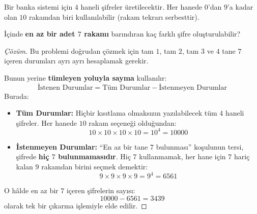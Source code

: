 \begin{example}
Bir banka sistemi için $4$ haneli şifreler üretilecektir. Her hanede $0$'dan $9$'a kadar olan $10$ rakamdan biri kullanılabilir (rakam tekrarı serbesttir). 

İçinde \textbf{en az bir adet $7$ rakamı} barındıran kaç farklı şifre oluşturulabilir?
\end{example}
\begin{proof}[Çözüm]
Bu problemi doğrudan çözmek için tam $1$, tam $2$, tam $3$ ve $4$ tane $7$ içeren durumları ayrı ayrı hesaplamak gerekir.

Bunun yerine \textbf{tümleyen yoluyla sayma} kullanılır:
\[ \text{İstenen Durumlar} = \text{Tüm Durumlar} - \text{İstenmeyen Durumlar} \]
Burada:
\begin{itemize}
  \item \textbf{Tüm Durumlar:} Hiçbir kısıtlama olmaksızın yazılabilecek tüm $4$ haneli şifreler.
  Her hanede $10$ rakam seçeneği olduğundan:
  \[ 10 \times 10 \times 10 \times 10 = 10^4 = 10000 \]
  \item \textbf{İstenmeyen Durumlar:} ``En az bir tane $7$ bulunması'' koşulunun tersi, şifrede \textbf{hiç $7$ bulunmamasıdır}.
  Hiç $7$ kullanmamak, her hane için $7$ hariç kalan $9$ rakamdan birini seçmek demektir:
  \[ 9 \times 9 \times 9 \times 9 = 9^4 = 6561 \]
\end{itemize}
O hâlde en az bir $7$ içeren şifrelerin sayısı:
\[ 10000 - 6561 = 3439 \]
olarak tek bir çıkarma işlemiyle elde edilir.
\end{proof}

